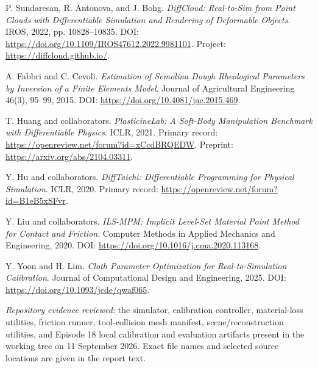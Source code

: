 \documentclass[11pt]{article}
\begin{document}
\begin{enumerate}[leftmargin=1.6em,label={[\arabic*]}]
\item P. Sundaresan, R. Antonova, and J. Bohg. \emph{DiffCloud: Real-to-Sim from Point Clouds with Differentiable Simulation and Rendering of Deformable Objects}. IROS, 2022, pp. 10828--10835. DOI: \url{https://doi.org/10.1109/IROS47612.2022.9981101}. Project: \url{https://diffcloud.github.io/}.
\item A. Fabbri and C. Cevoli. \emph{Estimation of Semolina Dough Rheological Parameters by Inversion of a Finite Elements Model}. Journal of Agricultural Engineering 46(3), 95--99, 2015. DOI: \url{https://doi.org/10.4081/jae.2015.469}.
\item T. Huang and collaborators. \emph{PlasticineLab: A Soft-Body Manipulation Benchmark with Differentiable Physics}. ICLR, 2021. Primary record: \url{https://openreview.net/forum?id=xCcdBRQEDW}. Preprint: \url{https://arxiv.org/abs/2104.03311}.
\item Y. Hu and collaborators. \emph{DiffTaichi: Differentiable Programming for Physical Simulation}. ICLR, 2020. Primary record: \url{https://openreview.net/forum?id=B1eB5xSFvr}.
\item Y. Liu and collaborators. \emph{ILS-MPM: Implicit Level-Set Material Point Method for Contact and Friction}. Computer Methods in Applied Mechanics and Engineering, 2020. DOI: \url{https://doi.org/10.1016/j.cma.2020.113168}.
\item Y. Yoon and H. Lim. \emph{Cloth Parameter Optimization for Real-to-Simulation Calibration}. Journal of Computational Design and Engineering, 2025. DOI: \url{https://doi.org/10.1093/jcde/qwaf065}.
\end{enumerate}

\vfill
\footnotesize\raggedright\textit{Repository evidence reviewed:} the simulator, calibration controller, material-loss utilities, friction runner, tool-collision mesh manifest, scene/reconstruction utilities, and Episode 18 local calibration and evaluation artifacts present in the working tree on 11 September 2026. Exact file names and selected source locations are given in the report text.
\end{document}
